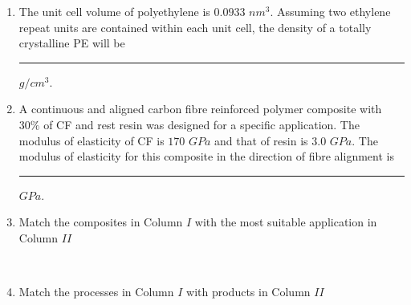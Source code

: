 \documentclass[journal,12pt,onecolumn]{IEEEtran}
\theoremstyle{remark}
\begin{document}
\begin{enumerate}
\item The unit cell volume of polyethylene  is $0.0933$ $nm^3$. Assuming two ethylene repeat units are contained within each unit cell, the density of a totally crystalline PE will be \rule{2.5cm}{0.4pt}$g/cm^3$. \\ 

\hfill{}

\item A continuous and aligned carbon fibre  reinforced polymer composite with $30\%$ of CF and rest resin was designed for a specific application. The modulus of elasticity of CF is $170$ $GPa$ and that of resin is $3.0$ $GPa$. The modulus of elasticity for this composite in the direction of fibre alignment is \rule{2.5cm}{0.4pt}$GPa$.

\hfill{}

\item Match the composites in Column $I$ with the most suitable application in Column $II$
\\\begin{table}[h!]    
  \centering
  
\end{table}\\

\hfill{}
\begin{enumerate}
\end{enumerate}

\item Match the processes in Column $I$ with products in Column $II$
\\\begin{table}[h!]    
  \centering
  
\end{table}\\

\hfill{}
\begin{enumerate}
\end{enumerate}


\end{enumerate}
\end{document}
